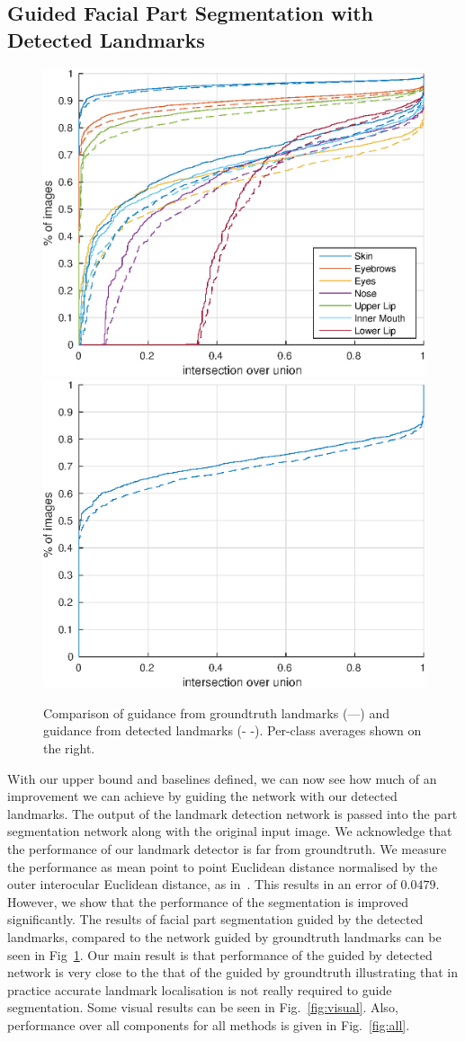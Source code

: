 \subsection{Guided Facial Part Segmentation with Detected Landmarks}

\begin{figure}
\includegraphics[width=0.5\linewidth]{figs/gtguided-vs-guided.eps}
\includegraphics[width=0.5\linewidth]{figs/gtguided-vs-guided-mean.eps}
\caption[Groundtruth vs. Detected landmarks for guidance]{Comparison
  of guidance from groundtruth landmarks (---) and guidance from
  detected landmarks (-{ }-). Per-class averages shown on the right.
}
\label{fig:gt-vs-det}
\end{figure}

With our upper bound and baselines defined, we can now see how much of
an improvement we can achieve by guiding the network with our
detected landmarks. The output of the landmark detection network is
passed into the part segmentation network along with the original
input image. We acknowledge that the performance of our landmark
detector is far from groundtruth. We measure the performance as mean
point to point Euclidean distance normalised by the outer interocular
Euclidean distance, as in~\cite{sagonas2013300}. This results in an
error of $0.0479$. However, we show that the performance of the
segmentation is improved significantly. The results of facial part
segmentation guided by the detected landmarks, compared to the network
guided by groundtruth landmarks can be seen in
Fig~\ref{fig:gt-vs-det}. Our main result is that performance of the
guided by detected network is very close to the that of the guided by
groundtruth illustrating that in practice accurate landmark
localisation is not really required to guide segmentation. Some visual
results can be seen in Fig.~\ref{fig:visual}. Also, performance over
all components for all methods is given in Fig.~\ref{fig:all}.



